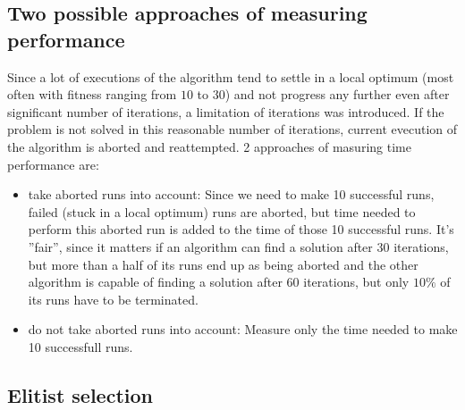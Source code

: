 \documentclass[a4paper]{article}
\begin{document}
\subsection{Two possible approaches of measuring performance}
Since a lot of executions of the algorithm tend to settle in a local optimum (most often with fitness ranging from $10$ to $30$)
and not progress any further even after significant number of iterations, a limitation of iterations was introduced.
If the problem is not solved in this reasonable number of iterations, current evecution of the algorithm is aborted and reattempted.
2 approaches of masuring time performance are:
\begin{itemize}
	\item	take aborted runs into account: Since we need to make 10 successful runs, failed (stuck in a local optimum) runs are aborted,
			but time needed to perform this aborted run is added to the time of those 10 successful runs. It's ''fair'', since it matters if
			an algorithm can find a solution after 30 iterations, but more than a half of its runs end up as being aborted and the other algorithm
			is capable of finding a solution after 60 iterations, but only $10\%$ of its runs have to be terminated.
	\item   do not take aborted runs into account: Measure only the time needed to make 10 successfull runs.
\end{itemize}

\subsection{Elitist selection}

\begin{table}[h]
\centering
\caption{Elitist selection}
\label{table:elitist}
\end{table}
\end{document}
